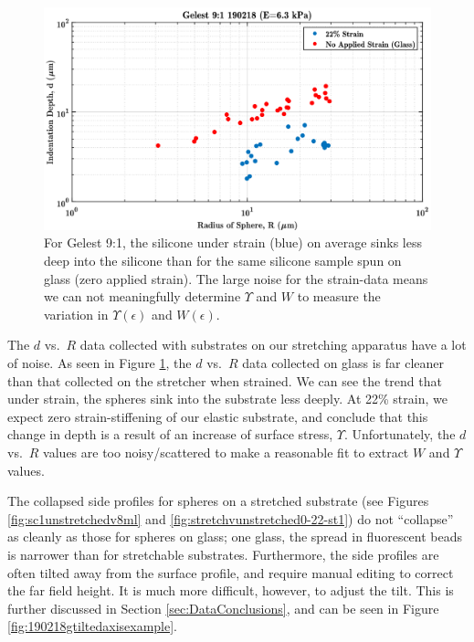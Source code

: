 \begin{figure}[h!]
	\centering
	\includegraphics[width=\linewidth]{Chapters/Figures/g190218_glass_vs_22percent_dvsR.pdf}
	\caption[Glass vs. Stretched d vs. R]{For Gelest 9:1, the silicone under strain (blue) on average sinks less deep into the silicone than for the same silicone sample spun on glass (zero applied strain). The large noise for the strain-data means we can not meaningfully determine $ \Upsilon $ and $ W $ to measure the variation in $ \Upsilon(\epsilon)$ and $W(\epsilon)$.}
	\label{fig:glassvsstretched190218}
\end{figure}

The $ d $ vs.~$R$ data collected with substrates on our stretching apparatus have a lot of noise. As seen in Figure \ref{fig:glassvsstretched190218}, the $ d $ vs.~$R$ data collected on glass is far cleaner than that collected on the stretcher when strained. We can see the trend that under strain, the spheres sink into the substrate less deeply. At 22\% strain, we expect zero strain-stiffening of our elastic substrate, and conclude that this change in depth is a result of an increase of surface stress, $ \Upsilon $. Unfortunately, the $ d $ vs.~$R$ values are too noisy/scattered to make a reasonable fit to extract $ W $ and $ \Upsilon $ values.

The collapsed side profiles for spheres on a stretched substrate (see Figures \ref{fig:sc1unstretchedv8ml} and \ref{fig:stretchvunstretched0-22-st1}) do not ``collapse'' as cleanly as those for spheres on glass; one glass, the spread in fluorescent beads is narrower than for stretchable substrates. Furthermore, the side profiles are often tilted away from the surface profile, and require manual editing to correct the far field height. It is much more difficult, however, to adjust the tilt. This is further discussed in Section \ref{sec:DataConclusions}, and can be seen in Figure \ref{fig:190218gtiltedaxisexample}.   

